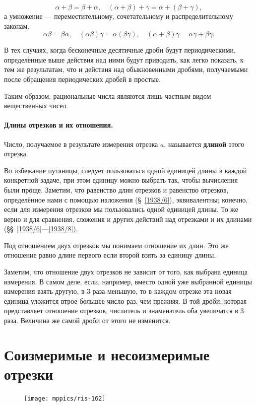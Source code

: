 \documentclass[oneside]{book}
\makeatletter
\newcommand{\rindex}[2][\imki@jobname]{%
  \index[#1]{\detokenize{#2}}%
}
\makeatother
\begin{document}
\[\alpha+\beta=\beta+\alpha,
\quad
(\alpha+\beta)+\gamma=\alpha+(\beta+\gamma),
\]
а умножение — переместительному, сочетательному и распределительному законам.
\[\alpha\beta=\beta\alpha,
\quad
(\alpha\beta)\gamma=\alpha(\beta\gamma),
\quad
(\alpha+\beta)\gamma=\alpha\gamma+\beta\gamma.
\]

В тех случаях, когда бесконечные десятичные дроби будут периодическими, определённые выше действия над ними будут приводить, как легко показать, к тем же результатам, что и действия над обыкновенными дробями, получаемыми после обращения периодических дробей в простые.

Таким образом, рациональные числа являются лишь частным видом вещественных чисел.
 
\paragraph{Длины отрезков и их отношения.}\label{1938/155}
Число, получаемое в результате измерения отрезка $a$, называется \rindex{длина}\textbf{длиной} этого отрезка.

Во избежание путаницы, следует пользоваться одной единицей длины в каждой конкретной задаче,
при этом единицу можно выбрать так, чтобы вычисления были проще.
Заметим, что равенство длин отрезков и равенство отрезков, определённое нами с помощью наложения (§~\ref{1938/6}), эквивалентны;
конечно, если для измерения отрезков мы пользовались одной единицей длины.
То же верно и для сравнения, сложения и других действий над отрезками и их длинами (§§~\ref{1938/6}---\ref{1938/8}).


Под отношением двух отрезков мы понимаем отношение их длин. 
Это же отношение равно длине первого если второй взять за единицу длины.

Заметим, что отношение двух отрезков не зависит от того, как выбрана единица измерения.
В самом деле, если, например, вместо одной уже выбранной единицы измерения взять другую, в 3 раза меньшую, то в каждом отрезке эта новая единица уложится втрое большее число раз, чем прежняя.
В той дроби, которая представляет отношение отрезков, числитель и знаменатель оба увеличатся в 3 раза.
Величина же самой дроби от этого не изменится.

\section{Соизмеримые и несоизмеримые отрезки}

\begin{figure}
\centering
\texttt{[image: mppics/ris-162]}
\caption{}\label{1938/ris-162}
\end{figure}
\end{document}
